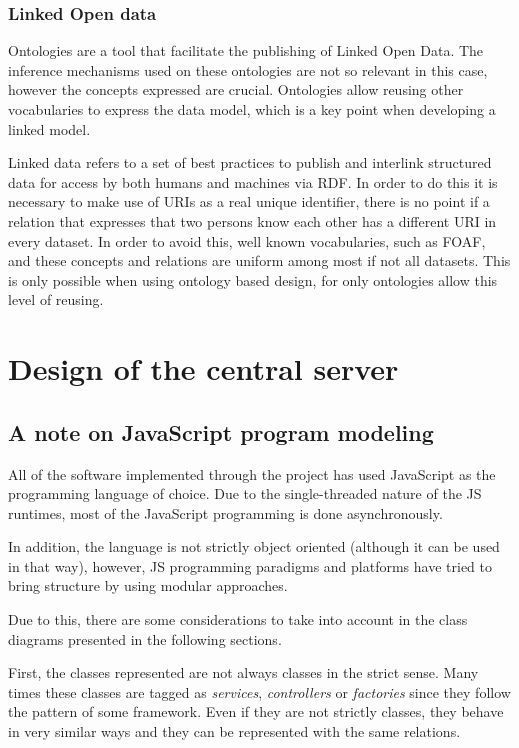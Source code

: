 \subsubsection{Linked Open data}

Ontologies are a tool that facilitate the publishing of Linked Open Data. The inference mechanisms used on these ontologies are not so relevant in this case, however the concepts expressed are crucial. Ontologies allow reusing other vocabularies to express the data model, which is a key point when developing a linked model.

Linked data refers to a set of best practices to publish and interlink structured data for access by both humans and machines via RDF. In order to do this it is necessary to make use of URIs as a real unique identifier, there is no point if a relation that expresses that two persons know each other has a different URI in every dataset. In order to avoid this, well known vocabularies, such as FOAF, and these concepts and relations are uniform among most if not all datasets. This is only possible when using ontology based design, for only ontologies allow this level of reusing.

\FloatBarrier

\section{Design of the central server}\label{sec:serverdesign}

\subsection*{A note on JavaScript program modeling}

All of the software implemented through the project has used JavaScript as the programming language of choice. Due to the single-threaded nature of the JS runtimes, most of the JavaScript programming is done asynchronously. 

In addition, the language is not strictly object oriented (although it can be used in that way), however, JS programming paradigms and platforms have tried to bring structure by using modular approaches.

Due to this, there are some considerations to take into account in the class diagrams presented in the following sections.

First, the classes represented are not always classes in the strict sense. Many times these classes are tagged as \textit{services}, \textit{controllers} or \textit{factories} since they follow the pattern of some framework. Even if they are not strictly classes, they behave in very similar ways and they can be represented with the same relations.

